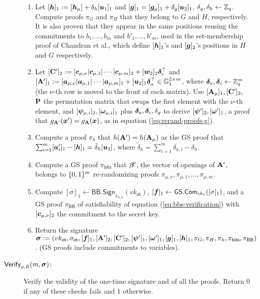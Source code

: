 \begin{description}
\begin{enumerate}
\item Let $[{\boldsymbol{h}}]_1:=[{\boldsymbol{h}}_\mu]+\delta_h[{\boldsymbol{u}}_1]_1$ and $[{\boldsymbol{g}}]_1=[{\boldsymbol{g}}_\mu]_1+\delta_g[{\boldsymbol{u}}_2]_1$, $\delta_g,\delta_h\gets\mathbb{Z}_q$. Compute proofs $\pi_G$ and $\pi_H$ that they belong to $G$ and $H$, respectively. It is also proven that they appear in the same positions reusing the commitments to $b_1,\ldots,b_{m}$ and $b'_1,\ldots,b'_{m}$, used in the set-membership proof of Chandran et al., which define $[{\boldsymbol{h}}]_1$'s and $[{\boldsymbol{g}}]_2$'s positions in $H$ and $G$ respectively.

\item Let
$
[\mathbf{{C}}']_2:=[{\boldsymbol{c}}_{\mu,\nu}|{\boldsymbol{c}}_{\mu,1}|\cdots|{\boldsymbol{c}}_{\mu,m}]_2+[{\boldsymbol{w}}_2]_2{\boldsymbol{\delta}}_c^\top$ and $[\mathbf{{A}}']_1:=[{\boldsymbol{a}}_{\mu,\nu} |\allowbreak {\boldsymbol{a}}_{\mu,1} | \cdots |\allowbreak{\boldsymbol{a}}_{\mu,m}]_1+[{\boldsymbol{u}}_2]_1{\boldsymbol{\delta}}_a^\top\in\mathbb{G}^{2\times m}_1$, where ${\boldsymbol{\delta}}_a,{\boldsymbol{\delta}}_c\gets\mathbb{Z}_q^m$ (the $\nu$-th row is moved to the front of each matrix).
Use $[\mathbf{{A}}_\mu]_1,[\mathbf{{C}}']_2$, $\mathbf{{P}}$ the permutation matrix that swaps the first element with the $\nu$-th element, and $[{\boldsymbol{\psi}}_{\mu,i}]_2,[{\boldsymbol{\omega}}_{\mu,i}]_1$ plus ${\boldsymbol{\delta}}_a,{\boldsymbol{\delta}}_c,\delta_g$ to derive $[{\boldsymbol{\psi}}']_2,[{\boldsymbol{\omega}}']_1$, a proof that $g_{\mathbf{{A}}'}({\boldsymbol{x}}')=g_{\mathbf{{A}}}({\boldsymbol{x}})$, as in equation (\ref{eq:rerand-proofs-g}).
\item Compute a proof $\pi_h$ that $h(\mathbf{{A}}')=h(\mathbf{{A}}_\mu)$ as the GS proof that $\sum_{i=1}^m [{\boldsymbol{a}}'_i]_1-[{\boldsymbol{h}}]_1 = \tilde{\delta}_h[{\boldsymbol{u}}_2]$, where $\tilde{\delta}_h = \sum_{i=1}^m\delta_{a,i}-\delta_h$.
\item Compute a GS proof $\pi_\mathsf{bits}$ that ${\boldsymbol{\beta}}'$, the vector of openings of  $\mathbf{{A}}'$, belongs to $\{0,1\}^m$ re-randomizing proofs $\pi_{\mu,\nu},\pi_{\mu,1},\allowbreak\ldots,\pi_{\mu,m}$.

\item Compute $[\sigma]_1\gets\mathsf{BB}.\mathsf{Sign}_{x_{\mu,\nu}}(vk_\mathsf{ot})$, $[{\boldsymbol{f}}]_1\gets{\mathsf{GS}}.\mathsf{Com}_{ck_1}([\sigma]_1)$, and a GS proof $\pi_\mathsf{BB}$ of satisfiability of equation (\ref{eq:bbs-verification}) with $[{\boldsymbol{c}}_{\mu,\nu}]_2$ the commitment to the secret key.

\item Return the signature ${\boldsymbol \sigma}:=(vk_\mathsf{ot},\sigma_\mathsf{ot},[{\boldsymbol{f}}]_1,[\mathbf{{A}}']_2,[\mathbf{{C}}']_2,[{\boldsymbol{\psi}}']_1,[{\boldsymbol{\omega}}']_1,[{\boldsymbol{g}}]_1,[{\boldsymbol{h}}]_1,\allowbreak\pi_G,\pi_H, \pi_h,\pi_{\mathsf{bits}},\pi_\mathsf{BB})$. (GS proofs include commitments to variables).
\end{enumerate}

\item[$\mathsf{Verify}_{\rho,R}(m,{\boldsymbol \sigma})$:] Verify the validity of the one-time signature and of all the proofs. Return 0 if any of these checks fails and 1 otherwise.
\end{description}

